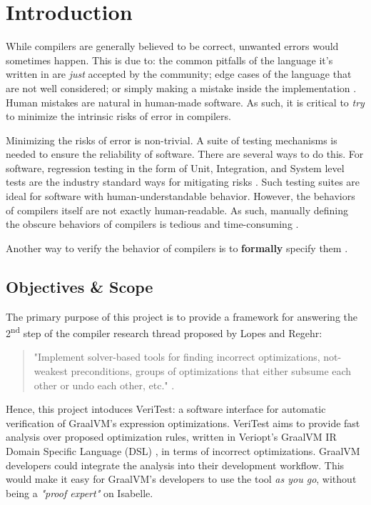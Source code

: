 \chapter{Introduction \label{sec:introduction}}

While compilers are generally believed to be correct, unwanted errors would sometimes happen. This is due to: the common pitfalls of the 
language it's written in are \emph{just} accepted by the community; edge cases of the language that are not well considered; or simply making a 
mistake inside the implementation \cite[Sec. 1.2]{CompilerOptimization}. Human mistakes are natural in human-made software. As such, it is 
critical to \emph{try} to minimize the intrinsic risks of error in compilers.

Minimizing the risks of error is non-trivial. A suite of testing mechanisms is needed to ensure the reliability of software. 
There are several ways to do this. For software, regression testing in the form of Unit, Integration, and System level tests are the 
industry standard ways for mitigating risks \cite{testing}. Such testing suites are ideal for software with human-understandable behavior. However, 
the behaviors of compilers itself are not exactly human-readable. As such, manually defining the obscure behaviors of compilers is tedious and 
time-consuming \cite{compcertVerification}.

Another way to verify the behavior of compilers is to \textbf{formally} specify them \cite{compcertVerification}. 

\section{Objectives \& Scope}

The primary purpose of this project is to provide a framework for answering the 2\textsuperscript{nd} step of the compiler research thread proposed by 
Lopes and Regehr:

\begin{quote}
    "Implement solver-based tools for finding incorrect optimizations, not-weakest
    preconditions, groups of optimizations that either subsume each other or
    undo each other, etc." \cite[p. 5]{CompilerOptimization}.
\end{quote}

Hence, this project intoduces VeriTest: a software interface for automatic verification of GraalVM's expression optimizations. VeriTest aims to provide 
fast analysis over proposed optimization rules, written in Veriopt's GraalVM IR Domain Specific Language (DSL) \cite[Sec. 3]{Term_Graph_Optimizations},
in terms of incorrect optimizations. GraalVM developers could integrate the analysis into their development workflow. This would make it easy for 
GraalVM's developers to use the tool \emph{as you go}, without being a \emph{"proof expert"} on Isabelle.


